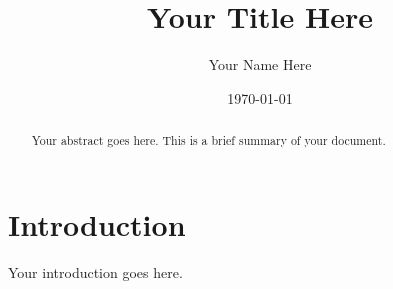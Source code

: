 \documentclass{article}
\begin{document}
\title{Your Title Here}
\author{Your Name Here}
\date{\today}
\maketitle

\begin{abstract}
Your abstract goes here. This is a brief summary of your document.
\end{abstract}

\tableofcontents

\section{Introduction}
Your introduction goes here.

\newpage
\printindex
\end{document}

